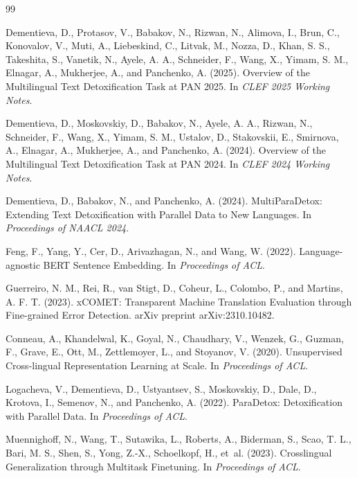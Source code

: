 \documentclass{article}
\begin{document}
\begin{thebibliography}{99}

Dementieva, D., Protasov, V., Babakov, N., Rizwan, N., Alimova, I., Brun, C., Konovalov, V., Muti, A., Liebeskind, C., Litvak, M., Nozza, D., Khan, S. S., Takeshita, S., Vanetik, N., Ayele, A. A., Schneider, F., Wang, X., Yimam, S. M., Elnagar, A., Mukherjee, A., and Panchenko, A. (2025).
\newblock Overview of the Multilingual Text Detoxification Task at PAN 2025.
\newblock In \emph{CLEF 2025 Working Notes}.

Dementieva, D., Moskovskiy, D., Babakov, N., Ayele, A. A., Rizwan, N., Schneider, F., Wang, X., Yimam, S. M., Ustalov, D., Stakovskii, E., Smirnova, A., Elnagar, A., Mukherjee, A., and Panchenko, A. (2024).
\newblock Overview of the Multilingual Text Detoxification Task at PAN 2024.
\newblock In \emph{CLEF 2024 Working Notes}.

Dementieva, D., Babakov, N., and Panchenko, A. (2024).
\newblock MultiParaDetox: Extending Text Detoxification with Parallel Data to New Languages.
\newblock In \emph{Proceedings of NAACL 2024}.

Feng, F., Yang, Y., Cer, D., Arivazhagan, N., and Wang, W. (2022).
\newblock Language-agnostic BERT Sentence Embedding.
\newblock In \emph{Proceedings of ACL}.

Guerreiro, N. M., Rei, R., van Stigt, D., Coheur, L., Colombo, P., and Martins, A. F. T. (2023).
\newblock xCOMET: Transparent Machine Translation Evaluation through Fine-grained Error Detection.
\newblock arXiv preprint arXiv:2310.10482.

Conneau, A., Khandelwal, K., Goyal, N., Chaudhary, V., Wenzek, G., Guzman, F., Grave, E., Ott, M., Zettlemoyer, L., and Stoyanov, V. (2020).
\newblock Unsupervised Cross-lingual Representation Learning at Scale.
\newblock In \emph{Proceedings of ACL}.

Logacheva, V., Dementieva, D., Ustyantsev, S., Moskovskiy, D., Dale, D., Krotova, I., Semenov, N., and Panchenko, A. (2022).
\newblock ParaDetox: Detoxification with Parallel Data.
\newblock In \emph{Proceedings of ACL}.

Muennighoff, N., Wang, T., Sutawika, L., Roberts, A., Biderman, S., Scao, T. L., Bari, M. S., Shen, S., Yong, Z.-X., Schoelkopf, H., et~al. (2023).
\newblock Crosslingual Generalization through Multitask Finetuning.
\newblock In \emph{Proceedings of ACL}.


\end{thebibliography}
\end{document}
